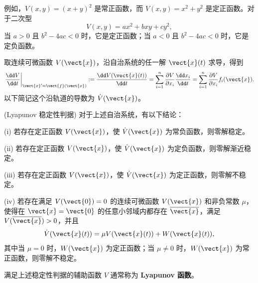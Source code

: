 例如，$V(x,y)=(x+y)^2$ 是常正函数，而
$V(x,y)=x^2+y^2$ 是定正函数。对于二次型
\[
	V(x,y)=ax^2+bxy+cy^2,
\]
当 $a>0$ 且 $b^2-4ac<0$ 时，它是定正函数；当 $a<0$ 且
$b^2-4ac<0$ 时，它是定负函数。

取连续可微函数 $V(\vect{x})$，沿自治系统的任一解
$\vect{x}(t)$ 求导，得到
\[
	\left.\dfrac{\dd V}{\dd t}\right|_{\vect{x}'=\vect{f}(\vect{x})}
	\mathrel{:=}
	\dfrac{\dd V(\vect{x}(t))}{\dd t}
	=\sum_{i=1}^n
	\dfrac{\partial V}{\partial x_i}
	\dfrac{\dd x_i}{\dd t}
	=\sum_{i=1}^n
	\dfrac{\partial V}{\partial x_i}f_i(\vect{x}).
\]
以下简记这个沿轨道的导数为 $\dot V(\vect{x})$。

\begin{theorem}(Lyapunov 稳定性判据)\label{thm:Lyapunov稳定性判据}
	对于上述自治系统，有以下结论：

	\textnormal{(i)} 若存在定正函数 $V(\vect{x})$，使
	$\dot V(\vect{x})$ 为常负函数，则零解稳定。

	\textnormal{(ii)} 若存在定正函数 $V(\vect{x})$，使
	$\dot V(\vect{x})$ 为定负函数，则零解渐近稳定。

	\textnormal{(iii)} 若存在定正函数 $V(\vect{x})$，使
	$\dot V(\vect{x})$ 为定正函数，则零解不稳定。

	\textnormal{(iv)} 若存在满足 $V(\vect{0})=0$ 的连续可微函数
	$V(\vect{x})$ 和非负常数 $\mu$，使得在
	$\vect{x}=\vect{0}$ 的任意小邻域内都存在
	$\overline{\vect{x}}$，满足 $V(\overline{\vect{x}})>0$，并且
	\[
		\dot V(\vect{x}(t))
		=\mu V(\vect{x}(t))+W(\vect{x}(t)),
	\]
	其中当 $\mu=0$ 时，$W(\vect{x})$ 为定正函数；当
	$\mu\neq0$ 时，$W(\vect{x})$ 为常正函数，则零解不稳定。
\end{theorem}

满足上述稳定性判据的辅助函数 $V$ 通常称为
\textbf{Lyapunov 函数}。

